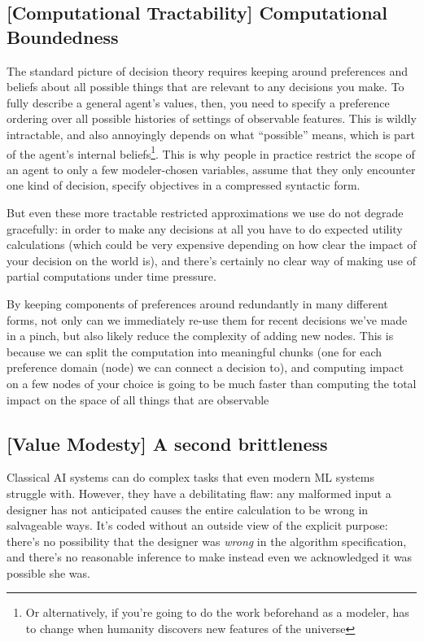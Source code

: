 \documentclass{article}
\begin{document}
	\subsection*{[Computational Tractability] Computational Boundedness}
	
	The standard picture of decision theory requires keeping around preferences and beliefs about all possible things that are relevant to any decisions you make. To fully describe a general agent's values, then, you need to specify a preference ordering over all possible histories of settings of observable features. This is wildly intractable, and also annoyingly depends on what ``possible'' means, which is part of the agent's internal beliefs\footnote{Or alternatively, if you're going to do the work beforehand as a modeler, has to change when humanity discovers new features of the universe}. This is why people in practice restrict the scope of an agent to only a few modeler-chosen variables, assume that they only encounter one kind of decision, specify objectives in a compressed syntactic form.
	
	But even these more tractable restricted approximations we use do not degrade gracefully: in order to make any decisions at all you have to do expected utility calculations (which could be very expensive depending on how clear the impact of your decision on the world is), and there's certainly no clear way of making use of partial computations under time pressure.
	
	{\color{green!30!black} By keeping components of preferences around redundantly in many different forms, not only can we immediately re-use them for recent decisions we've made in a pinch, but also likely reduce the complexity of adding new nodes. This is because we can split the computation into meaningful chunks (one for each preference domain (node) we can connect a decision to), and computing impact on a few nodes of your choice is going to be much faster than computing the total impact on the space of all things that are observable}
	
	\subsection*{[Value Modesty] A second brittleness}
	Classical AI systems can do complex tasks that even modern ML systems struggle with. However, they have a debilitating flaw: any malformed input a designer has not anticipated causes the entire calculation to be wrong in salvageable ways. It's coded without an outside view of the explicit purpose: there's no possibility that the designer was \textit{wrong} in the algorithm specification, and there's no reasonable inference to make instead even we acknowledged it was possible she was.
	
\end{document}
